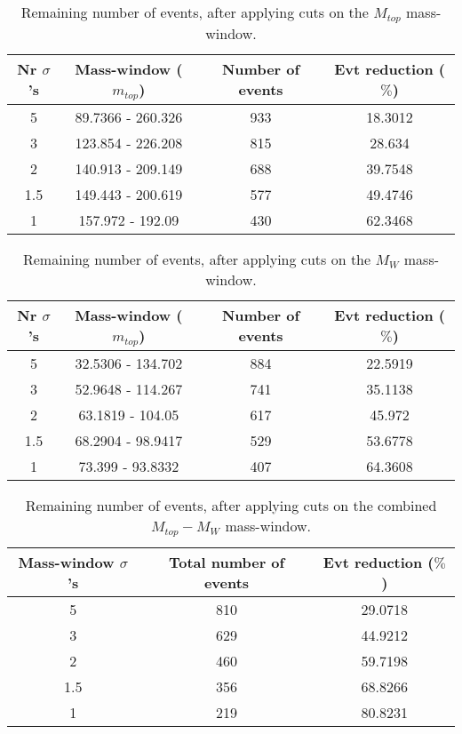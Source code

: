 \documentclass{article}
\begin{document}
 \begin{table}[h!t] 
  \caption{Remaining number of events, after applying cuts on the $M_{top}$ mass-window.} 
  \centering 
   \begin{tabular}{c|c|c|c|}
     Nr $\sigma$'s & Mass-window ($m_{top}$)   & Number of events   & Evt reduction ($\%$)     \\
     \hline
     5 & 89.7366 - 260.326  &   933 &  18.3012 \\ 
     3 & 123.854 - 226.208  &   815 &  28.634 \\ 
     2 & 140.913 - 209.149  &   688 &  39.7548 \\ 
     1.5 & 149.443 - 200.619  &   577 &  49.4746 \\ 
     1 & 157.972 - 192.09  &   430 &  62.3468 \\ 
   \end{tabular} 
 \end{table} 
 
 \begin{table}[h!t] 
  \caption{Remaining number of events, after applying cuts on the $M_{W}$ mass-window.} 
  \centering 
   \begin{tabular}{c|c|c|c|}
     Nr $\sigma$'s & Mass-window ($m_{top}$)    & Number of events   & Evt reduction ($\%$)    \\
     \hline
     5 & 32.5306 - 134.702  &   884 & 22.5919 \\ 
     3 & 52.9648 - 114.267  &   741 & 35.1138 \\ 
     2 & 63.1819 - 104.05  &   617 & 45.972 \\ 
     1.5 & 68.2904 - 98.9417  &   529 & 53.6778 \\ 
     1 & 73.399 - 93.8332  &   407 & 64.3608 \\ 
   \end{tabular} 
 \end{table} 
 
 \begin{table}[h!t] 
  \caption{Remaining number of events, after applying cuts on the combined $M_{top}-M_{W}$ mass-window.} 
  \centering 
   \begin{tabular}{c|c|c|} 
     Mass-window $\sigma$'s & Total number of events    & Evt reduction ($\%$)     \\ 
     \hline
     5 & 810 & 29.0718 \\ 
     3 & 629 & 44.9212 \\ 
     2 & 460 & 59.7198 \\ 
     1.5 & 356 & 68.8266 \\ 
     1 & 219 & 80.8231 \\ 
   \end{tabular} 
 \end{table} 
 
\end{document}
